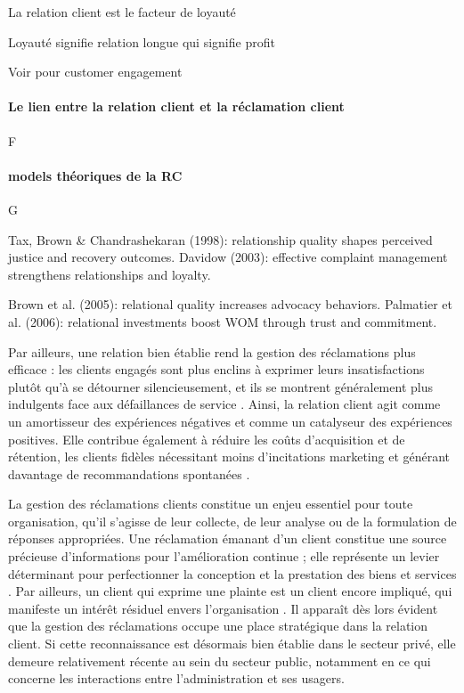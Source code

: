 \documentclass[a4paper,12pt]{report}
\begin{document}
La relation client est le facteur de loyauté

Loyauté signifie relation longue qui signifie profit \parencite{kumar06}


Voir \textcite{verhoef10} pour customer engagement

\paragraph{Le lien entre la relation client et la réclamation client} F

\paragraph{models théoriques de la RC} G


Tax, Brown \& Chandrashekaran (1998): relationship quality shapes perceived justice and recovery outcomes.
Davidow (2003): effective complaint management strengthens relationships and loyalty.

Brown et al. (2005): relational quality increases advocacy behaviors.
Palmatier et al. (2006): relational investments boost WOM through trust and commitment.


Par ailleurs, une relation bien établie rend la gestion des réclamations plus efficace : les clients engagés sont plus enclins à exprimer leurs insatisfactions plutôt qu’à se détourner silencieusement, et ils se montrent généralement plus indulgents face aux défaillances de service \parencite{tax98,davidow03}. Ainsi, la relation client agit comme un amortisseur des expériences négatives et comme un catalyseur des expériences positives. Elle contribue également à réduire les coûts d’acquisition et de rétention, les clients fidèles nécessitant moins d’incitations marketing et générant davantage de recommandations spontanées \parencite{reichheld90,brown05}.



\break







La gestion des réclamations clients constitue un enjeu essentiel pour toute organisation, qu’il s’agisse de leur collecte, de leur analyse ou de la formulation de réponses appropriées. Une réclamation émanant d’un client constitue une source précieuse d’informations pour l’amélioration continue \parencite[]{harari92} ; elle représente un levier déterminant pour perfectionner la conception et la prestation des biens et services \parencite[]{tax1998}. Par ailleurs, un client qui exprime une plainte est un client encore impliqué, qui manifeste un intérêt résiduel envers l’organisation \parencite[]{harari92}. Il apparaît dès lors évident que la gestion des réclamations occupe une place stratégique dans la relation client. Si cette reconnaissance est désormais bien établie dans le secteur privé, elle demeure relativement récente au sein du secteur public, notamment en ce qui concerne les interactions entre l’administration et ses usagers. \par 
\end{document}
